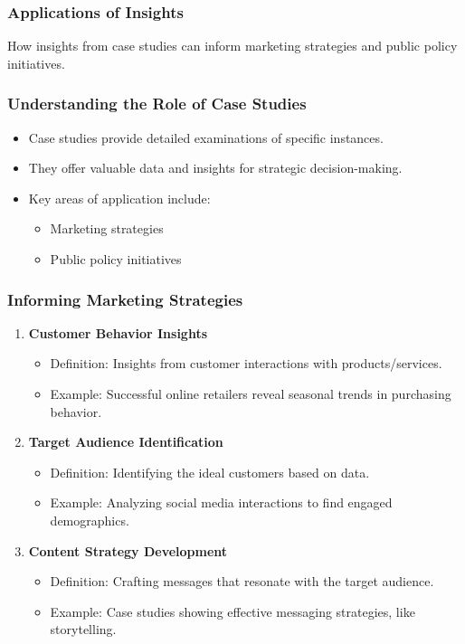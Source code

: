 \documentclass{beamer}
\begin{document}
\begin{frame}[fragile]
    \frametitle{Applications of Insights}
    How insights from case studies can inform marketing strategies and public policy initiatives.
\end{frame}

\begin{frame}[fragile]
    \frametitle{Understanding the Role of Case Studies}
    \begin{itemize}
        \item Case studies provide detailed examinations of specific instances.
        \item They offer valuable data and insights for strategic decision-making.
        \item Key areas of application include:
        \begin{itemize}
            \item Marketing strategies
            \item Public policy initiatives
        \end{itemize}
    \end{itemize}
\end{frame}

\begin{frame}[fragile]
    \frametitle{Informing Marketing Strategies}
    \begin{enumerate}
        \item \textbf{Customer Behavior Insights}
            \begin{itemize}
                \item Definition: Insights from customer interactions with products/services.
                \item Example: Successful online retailers reveal seasonal trends in purchasing behavior.
            \end{itemize}
            
        \item \textbf{Target Audience Identification}
            \begin{itemize}
                \item Definition: Identifying the ideal customers based on data.
                \item Example: Analyzing social media interactions to find engaged demographics.
            \end{itemize}
            
        \item \textbf{Content Strategy Development}
            \begin{itemize}
                \item Definition: Crafting messages that resonate with the target audience.
                \item Example: Case studies showing effective messaging strategies, like storytelling.
            \end{itemize}
    \end{enumerate}
\end{frame}
\end{document}
